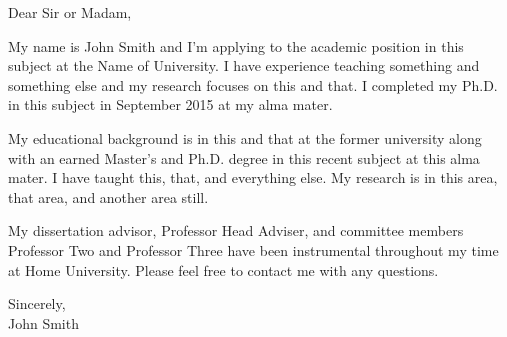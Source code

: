 \documentclass[letterpaper,10pt,oneside]{article}
\begin{document}
\vspace{2em}

Dear Sir or Madam, \\

\vspace{1em}
\onehalfspacing

My name is John Smith and I'm applying to the academic position in this subject at the Name of University. I have experience teaching something and something else and my research focuses on this and that. I completed my Ph.D. in this subject in September 2015 at my alma mater.

\vspace{1em}

My educational background is in this and that at the former university along with an earned Master's and Ph.D. degree in this recent subject at this alma mater. I have taught this, that, and everything else. My research is in this area, that area, and another area still.

\vspace{1em}

My dissertation advisor, Professor Head Adviser, and committee members Professor Two and Professor Three have been instrumental throughout my time at Home University. Please feel free to contact me with any questions.

\vspace{1em}

\begin{flushright}
Sincerely, \\
\vspace{1em} 
John Smith \\
\end{flushright}
\end{document}
